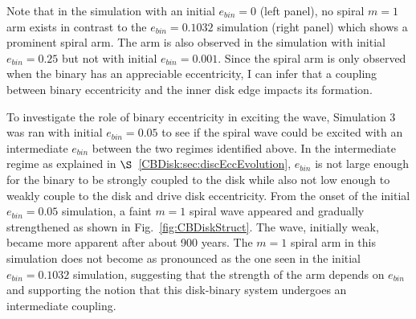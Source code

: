 Note that in the simulation with an initial $e_{bin} = 0$ (left panel), no spiral $m = 1$ 
arm exists in contrast to the $e_{bin} = 0.1032$ simulation (right panel) which
shows a prominent spiral arm.  The arm is also observed in the
simulation with initial $e_{bin} = 0.25$ but not with initial $e_{bin}
= 0.001$.  Since the spiral arm is only observed when the binary has
an appreciable eccentricity, I can infer that a coupling between binary eccentricity
and the inner disk edge impacts its formation.  

To investigate the role of binary eccentricity in exciting the wave, Simulation 3 was ran with initial $e_{bin} = 0.05$ to see if the spiral wave could be excited with an intermediate $e_{bin}$ between the two regimes identified above.  In the intermediate regime as explained in $\S$~\ref{CBDisk:sec:discEccEvolution}, $e_{bin}$ is not large enough for the binary to be strongly coupled to the disk while also not low enough to weakly couple to the disk and drive disk eccentricity.  From the onset of the initial $e_{bin} = 0.05$ simulation, a faint $m = 1$ spiral wave appeared and gradually strengthened as shown in Fig.~\ref{fig:CBDiskStruct}.  The wave, initially weak, became more apparent after about 900 years.  The $m = 1$ spiral arm in this simulation does not become as pronounced as the one seen in the initial $e_{bin} = 0.1032$ simulation, suggesting that the strength of the arm depends on $e_{bin}$ and supporting the notion that this disk-binary system undergoes an intermediate coupling.  

